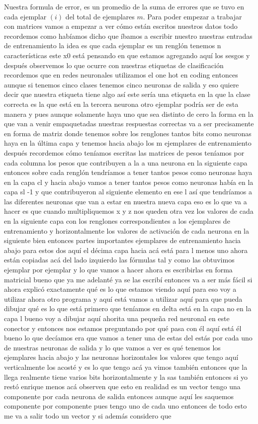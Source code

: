 Nuestra formula de error, es un promedio de la suma de errores que se tuvo en cada ejemplar $(i)$ del total de ejemplares $m$.
Para poder empezar a trabajar con matrices vamos a empezar a ver cómo están escritos nuestros datos todo recordemos como habíamos dicho que íbamos a escribir nuestro nuestras entradas de entrenamiento la idea es que cada ejemplar es un renglón tenemos n características este x0 está pensando en que estamos agregando aquí los sesgos y después observemos lo que ocurre con nuestras etiquetas de clasificación recordemos que en redes neuronales utilizamos el one hot en coding entonces aunque si tenemos cinco clases tenemos cinco neuronas de salida y eso quiere decir que nuestra etiqueta tiene algo así este sería una etiqueta en la que la clase correcta es la que está en la tercera neurona otro ejemplar podría ser de esta manera y pues aunque solamente haya uno que sea distinto de cero la forma en la que van a venir empaquetadas nuestras respuestas correctas va a ser precisamente en forma de matriz donde tenemos sobre los renglones tantos bits como neuronas haya en la última capa y tenemos hacia abajo los m ejemplares de entrenamiento después recordemos cómo teníamos escritas las matrices de pesos teníamos por cada columna los pesos que contribuyen a la a una neurona en la siguiente capa entonces sobre cada renglón tendríamos a tener tantos pesos como neuronas haya en la capa cl y hacia abajo vamos a tener tantos pesos como neuronas había en la capa sl -1 y que contribuyeron al siguiente elemento en ese l así que tendríamos a las diferentes neuronas que van a estar en nuestra nueva capa eso es lo que va a hacer es que cuando multipliquemos x y z nos queden otra vez los valores de cada en la siguiente capa con los renglones correspondientes a los ejemplares de entrenamiento y horizontalmente los valores de activación de cada neurona en la siguiente bien entonces partes importantes ejemplares de entrenamiento hacia abajo para estos dos aquí el décima capa hacia acá está para l menos uno ahora están copiadas acá del lado izquierdo las fórmulas tal y como las obtuvimos ejemplar por ejemplar y lo que vamos a hacer ahora es escribirlas en forma matricial bueno que ya me adelanté ya se las escribí entonces va a ser más fácil si ahora explicó exactamente qué es lo que estamos viendo aquí para eso voy a utilizar ahora otro programa y aquí está vamos a utilizar aquí para que pueda dibujar qué es lo que está primero que teníamos en delta está en la capa no en la capa l bueno voy a dibujar aquí ahorita una pequeña red neuronal en este conector y entonces nos estamos preguntando por qué pasa con él aquí está él bueno lo que decíamos era que vamos a tener una de estas del estás por cada uno de nuestras neuronas de salida y lo que vamos a ver es qué tenemos los ejemplares hacia abajo y las neuronas horizontales los valores que tengo aquí verticalmente los acosté y es lo que tengo acá ya vimos también entonces que la llega realmente tiene varios bits horizontalmente y la sas también entonces si yo restó enrique menos acá observen que esto en realidad es un vector tengo una componente por cada neurona de salida entonces aunque aquí les saquemos componente por componente pues tengo uno de cada uno entonces de todo esto me va a salir todo un vector y si además considero que 